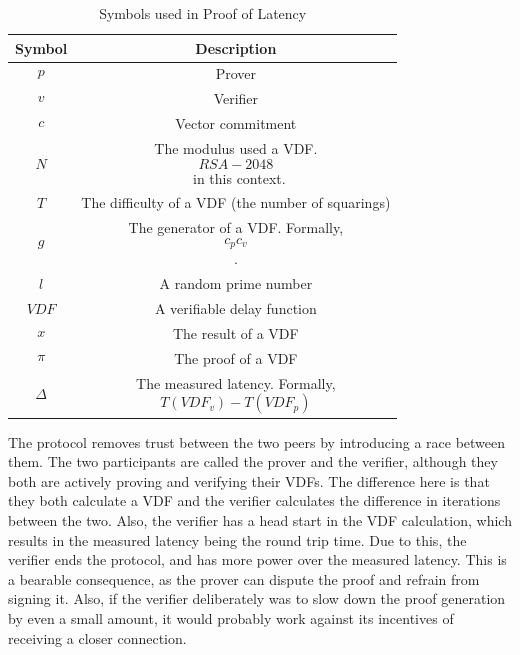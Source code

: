 \begin{table}[h!]
	\centering
	\begin{tabular}{ c|c  }
		Symbol     & Description                                             \\
		\hline
		\[ p \]    & Prover                                                  \\
		\[ v \]    & Verifier                                                \\
		\[ c \]    & Vector commitment                                       \\
		\[ N \]    & The modulus used a VDF. \[RSA-2048\]~in this context.   \\

		\[ T \]    & The difficulty of a VDF (the number of squarings)       \\
		\[ g \]    & The generator of a VDF. Formally, \[c_p c_v\].          \\
		\[ l \]    & A random prime number                                   \\
		\[ VDF \]  & A verifiable delay function                             \\
		\[ x \]    & The result of a VDF                                     \\
		\[\pi \]   & The proof of a VDF                                      \\
		\[\Delta\] & The measured latency. Formally, \[T(VDF_v) - T(VDF_p)\] \\
	\end{tabular}
	\caption{Symbols used in Proof of Latency}
	\label{table:1}
\end{table}


The protocol removes trust between the two peers by introducing a race between them. The two participants are called the prover and the verifier, although they both are actively proving and verifying their VDFs. The difference here is that they both calculate a VDF and the verifier calculates the difference in iterations between the two. Also, the verifier has a head start in the VDF calculation, which results in the measured latency being the round trip time. Due to this, the verifier ends the protocol, and has more power over the measured latency. This is a bearable consequence, as the prover can dispute the proof and refrain from signing it. Also, if the verifier deliberately was to slow down the proof generation by even a small amount, it would probably work against its incentives of receiving a closer connection.

